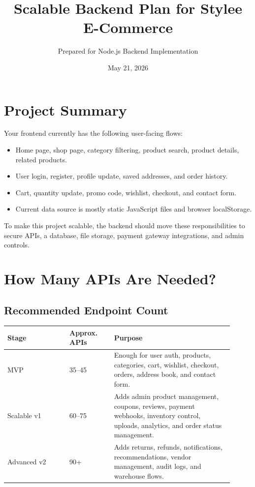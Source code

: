 \documentclass[11pt,a4paper]{article}
\title{\textbf{Scalable Backend Plan for Stylee E-Commerce}}
\author{Prepared for Node.js Backend Implementation}
\date{May 21, 2026}
\begin{document}
\maketitle
\tableofcontents
\newpage

\section{Project Summary}

Your frontend currently has the following user-facing flows:

\begin{itemize}
  \item Home page, shop page, category filtering, product search, product details, related products.
  \item User login, register, profile update, saved addresses, and order history.
  \item Cart, quantity update, promo code, wishlist, checkout, and contact form.
  \item Current data source is mostly static JavaScript files and browser localStorage.
\end{itemize}

To make this project scalable, the backend should move these responsibilities to secure APIs, a database, file storage, payment gateway integrations, and admin controls.

\section{How Many APIs Are Needed?}

\subsection{Recommended Endpoint Count}

\begin{longtable}{p{0.25\linewidth} p{0.18\linewidth} p{0.48\linewidth}}
\toprule
\textbf{Stage} & \textbf{Approx. APIs} & \textbf{Purpose} \\
\midrule
MVP & 35--45 & Enough for user auth, products, categories, cart, wishlist, checkout, orders, address book, and contact form. \\
Scalable v1 & 60--75 & Adds admin product management, coupons, reviews, payment webhooks, inventory control, uploads, analytics, and order status management. \\
Advanced v2 & 90+ & Adds returns, refunds, notifications, recommendations, vendor management, audit logs, and warehouse flows. \\
\bottomrule
\end{longtable}
\end{document}
